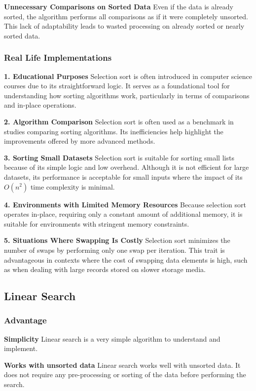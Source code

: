 \textbf{Unnecessary Comparisons on Sorted Data} 
Even if the data is already sorted, the algorithm performs all comparisons as if it were completely unsorted. This lack of adaptability leads to wasted processing on already sorted or nearly sorted data. 

\subsubsection{Real Life Implementations}

\textbf{1. Educational Purposes} 
   Selection sort is often introduced in computer science courses due to its straightforward logic. It serves as a foundational tool for understanding how sorting algorithms work, particularly in terms of comparisons and in-place operations. 

\textbf{2. Algorithm Comparison }
   Selection sort is often used as a benchmark in studies comparing sorting algorithms. Its inefficiencies help highlight the improvements offered by more advanced methods. 

\textbf{3. Sorting Small Datasets }
   Selection sort is suitable for sorting small lists because of its simple logic and low overhead. Although it is not efficient for large datasets, its performance is acceptable for small inputs where the impact of its $O(n^2)$ time complexity is minimal. 

\textbf{4. Environments with Limited Memory Resources} 
   Because selection sort operates in-place, requiring only a constant amount of additional memory, it is suitable for environments with stringent memory constraints. 

\textbf{5. Situations Where Swapping Is Costly }
   Selection sort minimizes the number of swaps by performing only one swap per iteration. This trait is advantageous in contexts where the cost of swapping data elements is high, such as when dealing with large records stored on slower storage media. 

\subsection{Linear Search}

\subsubsection{Advantage}
\textbf{Simplicity} 
Linear search is a very simple algorithm to understand and implement. 

\textbf{Works with unsorted data} 
Linear search works well with unsorted data. It does not require any pre-processing or sorting of the data before performing the search. 

